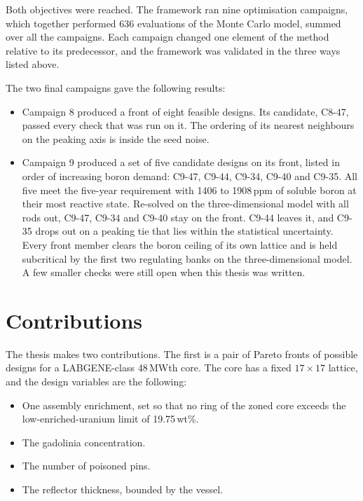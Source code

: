 Both objectives were reached. The framework ran nine optimisation campaigns, which together performed
636 evaluations of the Monte Carlo model, summed over all the campaigns.
Each campaign changed one element of the method relative to its
predecessor, and the framework was validated in the three ways listed
above.

The two final campaigns gave the following results:

\begin{itemize}
  \item Campaign 8 produced a front of eight feasible designs. Its
        candidate, C8-47, passed every check that was run on it.
        The ordering of its nearest neighbours on the peaking axis is
        inside the seed noise.

  \item Campaign 9 produced a set of five candidate designs on its
        front, listed in order of increasing boron demand:
        C9-47, C9-44, C9-34, C9-40 and C9-35. All five meet the
        five-year requirement with 1406 to 1908\,ppm of soluble boron
        at their most reactive state. Re-solved on the
        three-dimensional model with all rods out, C9-47, C9-34 and
        C9-40 stay on the front. C9-44 leaves it, and C9-35 drops out on
        a peaking tie that lies within the statistical uncertainty. 
        Every front member clears the boron ceiling of its own
        lattice and is held subcritical by the first two regulating
        banks on the three-dimensional model. A few smaller checks were
        still open when this thesis was written.
\end{itemize}

\section{Contributions}
\label{sec:intro-contributions}

The thesis makes two contributions. The first is a pair of Pareto fronts of possible designs for a
LABGENE-class 48\,MWth core. The core has a fixed $17\times17$ lattice,
and the design variables are the following:

\begin{itemize}
  \item One assembly enrichment, set so that no ring of the zoned core
        exceeds the low-enriched-uranium limit of 19.75\,wt\%.

  \item The gadolinia concentration.

  \item The number of poisoned pins.

  \item The reflector thickness, bounded by the vessel.
\end{itemize}

